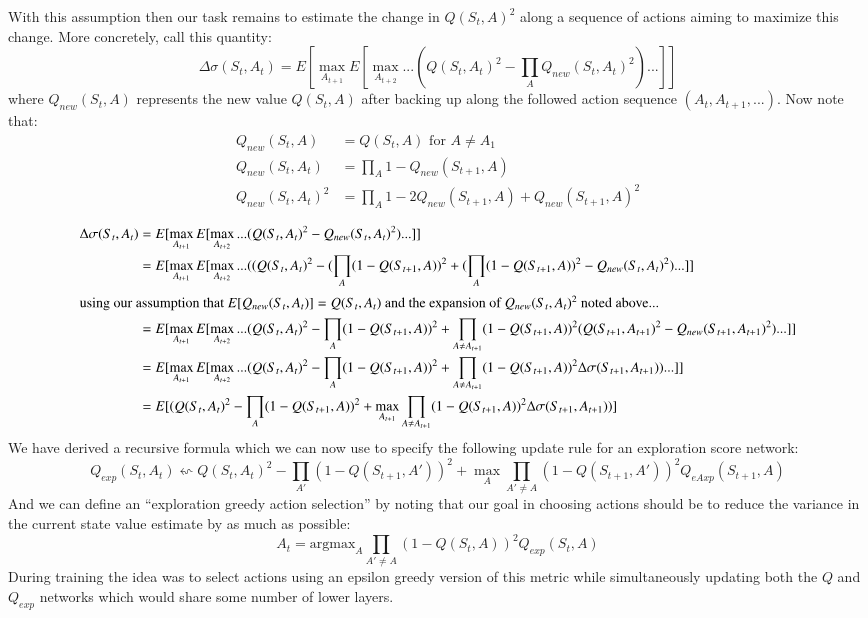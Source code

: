 \documentclass{article}
\begin{document}
With this assumption then our task remains to estimate the change in $Q(S_t,A)^2$ along a sequence of actions aiming to maximize this change. More concretely, call this quantity:
$$\Delta \sigma(S_t,A_t) = E[\max_{A_{t+1}}E[\max_{A_{t+2}}...(Q(S_t,A_t)^2-\prod_A Q_{new}(S_t,A_t)^2)...]]$$
where $Q_{new}(S_t,A)$ represents the new value $Q(S_t,A)$ after backing up along the followed action sequence $(A_t,A_{t+1},...)$. Now note that:
\begin{align*}
Q_{new}(S_t,A) &=Q(S_t,A) \text{ for } A\neq A_1\\
Q_{new}(S_t,A_t) &=\prod_A 1-Q_{new}(S_{t+1},A)\\
Q_{new}(S_t,A_t)^2&=\prod_A 1-2Q_{new}(S_{t+1},A)+Q_{new}(S_{t+1},A)^2\\
\end{align*}
\begin{align*}
\Delta \sigma(S_t,A_t) &= E[\max_{A_{t+1}}E[\max_{A_{t+2}}...( Q(S_t,A_t)^2- Q_{new}(S_t,A_t)^2)...]]\\
&=E[\max_{A_{t+1}}E[\max_{A_{t+2}}...((Q(S_t,A_t)^2-(\prod_{A} (1-Q(S_{t+1},A))^2+(\prod_{A} (1-Q(S_{t+1},A))^2-Q_{new}(S_t,A_t)^2)...]]\\
\intertext{using our assumption that $E[Q_{new}(S_t,A_t)]=Q(S_t,A_t)$ and the expansion of $Q_{new}(S_t,A_t)^2$ noted above... }
&=E[\max_{A_{t+1}}E[\max_{A_{t+2}}...(Q(S_t,A_t)^2-\prod_{A} (1-Q(S_{t+1},A))^2+\prod_{A\neq{A_{t+1}}} (1-Q(S_{t+1},A))^2(Q(S_{t+1},A_{t+1})^2-Q_{new}(S_{t+1},A_{t+1})^2)...]]\\
&=E[\max_{A_{t+1}}E[\max_{A_{t+2}}...(Q(S_t,A_t)^2-\prod_{A} (1-Q(S_{t+1},A))^2+\prod_{A\neq{A_{t+1}}} (1-Q(S_{t+1},A))^2\Delta \sigma(S_{t+1},A_{t+1}))...]]\\
&=E[(Q(S_t,A_t)^2-\prod_{A} (1-Q(S_{t+1},A))^2+\max_{A_{t+1}}\prod_{A\neq{A_{t+1}}} (1-Q(S_{t+1},A))^2\Delta \sigma(S_{t+1},A_{t+1}))]
\end{align*}
We have derived a recursive formula which we can now use to specify the following update rule for an exploration score network:
$$Q_{exp}(S_t,A_t)\leftsquigarrow Q(S_t,A_t)^2-\prod_{A'} (1-Q(S_{t+1},A'))^2+\max_A\prod_{A'\neq A} (1-Q(S_{t+1},A'))^2Q_{eAxp}(S_{t+1},A)$$
And we can define an ``exploration greedy action selection'' by noting that our goal in choosing actions should be to reduce the variance in the current state value estimate by as much as possible:
$$A_t= \text{argmax}_A\prod_{A'\neq A}(1-Q(S_t,A))^2Q_{exp}(S_t,A)$$
During training the idea was to select actions using an epsilon greedy version of this metric while simultaneously updating both the $Q$ and $Q_{exp}$ networks which would share some number of lower layers. 
\end{document}
